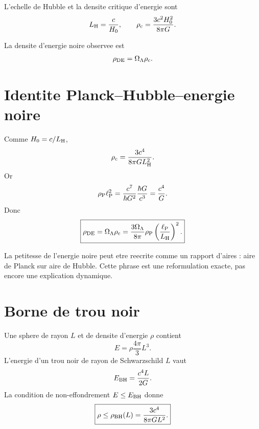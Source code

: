 \documentclass[11pt,a4paper]{article}
\newcommand{\lp}{\ell_{\rm P}}
\newcommand{\rhoP}{\rho_{\rm P}}
\newcommand{\rhoDE}{\rho_{\rm DE}}
\newcommand{\rhoC}{\rho_{\rm c}}
\newcommand{\LH}{L_{\rm H}}
\newcommand{\rhobh}{\rho_{\rm BH}}
\begin{document}
L'echelle de Hubble et la densite critique d'energie sont
\begin{equation}
\LH=\frac{c}{H_0},
\qquad
\rhoC=\frac{3c^2H_0^2}{8\pi G}.
\end{equation}

La densite d'energie noire observee est
\begin{equation}
\rhoDE=\Omega_\Lambda\rhoC.
\end{equation}

\section{Identite Planck--Hubble--energie noire}

Comme $H_0=c/\LH$,
\begin{equation}
\rhoC=\frac{3c^4}{8\pi G\LH^2}.
\end{equation}
Or
\begin{equation}
\rhoP\lp^2
=\frac{c^7}{\hbar G^2}\frac{\hbar G}{c^3}
=\frac{c^4}{G}.
\end{equation}
Donc
\begin{equation}
\boxed{
\rhoDE
=\Omega_\Lambda\rhoC
=\frac{3\Omega_\Lambda}{8\pi}\rhoP
\left(\frac{\lp}{\LH}\right)^2.
}
\label{eq:master_uv_ir}
\end{equation}

\begin{tcolorbox}[colback=blue!3!white,colframe=blue!45!black,title=Lecture]
La petitesse de l'energie noire peut etre reecrite comme un rapport d'aires :
aire de Planck sur aire de Hubble. Cette phrase est une reformulation exacte,
pas encore une explication dynamique.
\end{tcolorbox}

\section{Borne de trou noir}

Une sphere de rayon $L$ et de densite d'energie $\rho$ contient
\begin{equation}
E=\rho\frac{4\pi}{3}L^3.
\end{equation}
L'energie d'un trou noir de rayon de Schwarzschild $L$ vaut
\begin{equation}
E_{\rm BH}=\frac{c^4L}{2G}.
\end{equation}
La condition de non-effondrement $E\leq E_{\rm BH}$ donne
\begin{equation}
\boxed{
\rho\leq\rhobh(L)=\frac{3c^4}{8\pi G L^2}.
}
\label{eq:rho_bh}
\end{equation}
\end{document}
